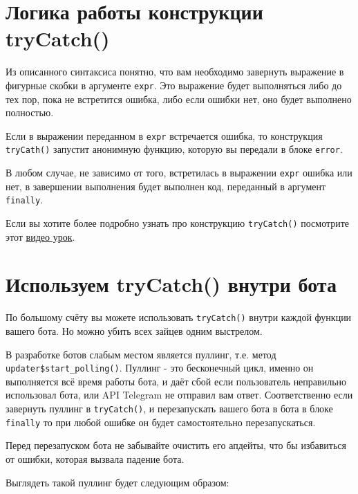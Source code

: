 \documentclass[
]{book}
\begin{document}
\section{Логика работы конструкции tryCatch()}\label{ux43bux43eux433ux438ux43aux430-ux440ux430ux431ux43eux442ux44b-ux43aux43eux43dux441ux442ux440ux443ux43aux446ux438ux438-trycatch}

Из описанного синтаксиса понятно, что вам необходимо завернуть выражение в фигурные скобки в аргументе \texttt{expr}. Это выражение будет выполняться либо до тех пор, пока не встретится ошибка, либо если ошибки нет, оно будет выполнено полностью.

Если в выражении переданном в \texttt{expr} встречается ошибка, то конструкция \texttt{tryCath()} запустит анонимную функцию, которую вы передали в блоке \texttt{error}.

В любом случае, не зависимо от того, встретилась в выражении \texttt{expr} ошибка или нет, в завершении выполнения будет выполнен код, переданный в аргумент \texttt{finally}.

Если вы хотите более подробно узнать про конструкцию \texttt{tryCatch()} посмотрите этот \href{https://youtu.be/GvmjW34IHu8}{видео урок}.

\section{Используем tryCatch() внутри бота}\label{ux438ux441ux43fux43eux43bux44cux437ux443ux435ux43c-trycatch-ux432ux43dux443ux442ux440ux438-ux431ux43eux442ux430}

По большому счёту вы можете использовать \texttt{tryCatch()} внутри каждой функции вашего бота. Но можно убить всех зайцев одним выстрелом.

В разработке ботов слабым местом является пуллинг, т.е. метод \texttt{updater\$start\_polling()}. Пуллинг - это бесконечный цикл, именно он выполняется всё время работы бота, и даёт сбой если пользователь неправильно использовал бота, или API Telegram не отправил вам ответ. Соответственно если завернуть пуллинг в \texttt{tryCatch()}, и перезапускать вашего бота в бота в блоке \texttt{finally} то при любой ошибке он будет самостоятельно перезапускаться.

Перед перезапуском бота не забывайте очистить его апдейты, что бы избавиться от ошибки, которая вызвала падение бота.

Выглядеть такой пуллинг будет следующим образом:
\end{document}

